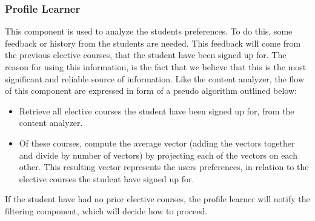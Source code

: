 \subsubsection{Profile Learner}
This component is used to analyze the students preferences. To do this, some feedback or history from the students are needed. This feedback will come from the previous elective courses, that the student have been signed up for. The reason for using this information, is the fact that we believe that this is the most significant and reliable source of information. Like the content analyzer, the flow of this component are expressed in form of a pseudo algorithm outlined below:
\begin{itemize}
	\item Retrieve all elective courses the student have been signed up for, from the content analyzer.
	\item Of these courses, compute the average vector (adding the vectors together and divide by number of vectors) by projecting each of the vectors on each other. This resulting vector represents the users preferences, in relation to the elective courses the student have signed up for. 
\end{itemize}
If the student have had no prior elective courses, the profile learner will notify the filtering component, which will decide how to proceed. 

